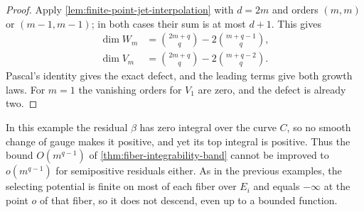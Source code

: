 \begin{proof}
Apply \cref{lem:finite-point-jet-interpolation} with $d=2m$ and orders $(m,m)$ or $(m-1,m-1)$; in both cases their sum is at most $d+1$. This gives
\[
 \begin{aligned}
 \dim W_m&=\binom{2m+q}{q}-2\binom{m+q-1}{q},\\
 \dim V_m&=\binom{2m+q}{q}-2\binom{m+q-2}{q}.
 \end{aligned}
\]
Pascal's identity gives the exact defect, and the leading terms give both growth laws. For $m=1$ the vanishing orders for $V_1$ are zero, and the defect is already two.
\end{proof}

In this example the residual $\beta$ has zero integral over the curve $C$, so no smooth change of gauge makes it positive, and yet its top integral is positive. Thus the bound $O(m^{q-1})$ of \cref{thm:fiber-integrability-band} cannot be improved to $o(m^{q-1})$ for semipositive residuals either. As in the previous examples, the selecting potential is finite on most of each fiber over $E_i$ and equals $-\infty$ at the point $o$ of that fiber, so it does not descend, even up to a bounded function.
